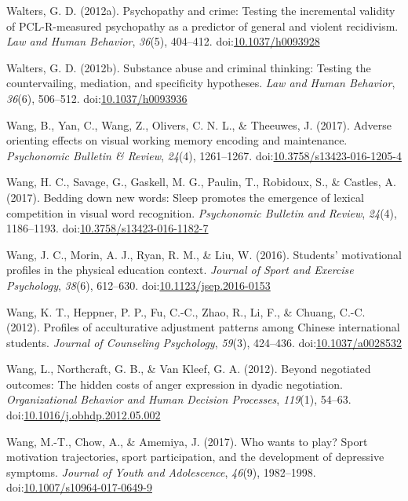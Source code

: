\documentclass[english,man]{apa6}
\theoremstyle{definition}
\theoremstyle{definition}
\theoremstyle{definition}
\theoremstyle{remark}
\begin{document}
\hypertarget{ref-Walters2012}{}
Walters, G. D. (2012a). Psychopathy and crime: Testing the incremental
validity of PCL-R-measured psychopathy as a predictor of general and
violent recidivism. \emph{Law and Human Behavior}, \emph{36}(5),
404--412. doi:\href{https://doi.org/10.1037/h0093928}{10.1037/h0093928}

\hypertarget{ref-Walters2012a}{}
Walters, G. D. (2012b). Substance abuse and criminal thinking: Testing
the countervailing, mediation, and specificity hypotheses. \emph{Law and
Human Behavior}, \emph{36}(6), 506--512.
doi:\href{https://doi.org/10.1037/h0093936}{10.1037/h0093936}

\hypertarget{ref-Wang2016}{}
Wang, B., Yan, C., Wang, Z., Olivers, C. N. L., \& Theeuwes, J. (2017).
Adverse orienting effects on visual working memory encoding and
maintenance. \emph{Psychonomic Bulletin \& Review}, \emph{24}(4),
1261--1267.
doi:\href{https://doi.org/10.3758/s13423-016-1205-4}{10.3758/s13423-016-1205-4}

\hypertarget{ref-Wang2016a}{}
Wang, H. C., Savage, G., Gaskell, M. G., Paulin, T., Robidoux, S., \&
Castles, A. (2017). Bedding down new words: Sleep promotes the emergence
of lexical competition in visual word recognition. \emph{Psychonomic
Bulletin and Review}, \emph{24}(4), 1186--1193.
doi:\href{https://doi.org/10.3758/s13423-016-1182-7}{10.3758/s13423-016-1182-7}

\hypertarget{ref-Wang2016b}{}
Wang, J. C., Morin, A. J., Ryan, R. M., \& Liu, W. (2016). Students'
motivational profiles in the physical education context. \emph{Journal
of Sport and Exercise Psychology}, \emph{38}(6), 612--630.
doi:\href{https://doi.org/10.1123/jsep.2016-0153}{10.1123/jsep.2016-0153}

\hypertarget{ref-Wang2012a}{}
Wang, K. T., Heppner, P. P., Fu, C.-C., Zhao, R., Li, F., \& Chuang,
C.-C. (2012). Profiles of acculturative adjustment patterns among
Chinese international students. \emph{Journal of Counseling Psychology},
\emph{59}(3), 424--436.
doi:\href{https://doi.org/10.1037/a0028532}{10.1037/a0028532}

\hypertarget{ref-Wang2012b}{}
Wang, L., Northcraft, G. B., \& Van Kleef, G. A. (2012). Beyond
negotiated outcomes: The hidden costs of anger expression in dyadic
negotiation. \emph{Organizational Behavior and Human Decision
Processes}, \emph{119}(1), 54--63.
doi:\href{https://doi.org/10.1016/j.obhdp.2012.05.002}{10.1016/j.obhdp.2012.05.002}

\hypertarget{ref-Wang2017}{}
Wang, M.-T., Chow, A., \& Amemiya, J. (2017). Who wants to play? Sport
motivation trajectories, sport participation, and the development of
depressive symptoms. \emph{Journal of Youth and Adolescence},
\emph{46}(9), 1982--1998.
doi:\href{https://doi.org/10.1007/s10964-017-0649-9}{10.1007/s10964-017-0649-9}
\end{document}
